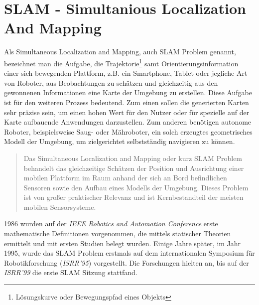 \section{SLAM - Simultanious Localization And Mapping}
\label{chap:SLAM}
Als Simultaneous Localization and Mapping, auch \acs{SLAM} Problem genannt, bezeichnet man die Aufgabe, die Trajektorie\footnote{Lösungskurve oder Bewegungspfad eines Objekts} 
samt Orientierungsinformation einer sich bewegenden Plattform, z.B. ein Smartphone, Tablet oder jegliche Art von Roboter, aus 
Beobachtungen zu schätzen und gleichzeitig aus den gewonnenen Informationen eine Karte der Umgebung zu erstellen.
Diese Aufgabe ist für den weiteren Prozess bedeutend. Zum einen sollen die generierten Karten sehr präzise sein, um einen hohen 
Wert für den Nutzer oder für spezielle auf der Karte aufbauende Anwendungen darzustellen. Zum anderen benötigen autonome Roboter, 
beispielsweise Saug- oder Mähroboter, ein solch erzeugtes geometrisches Modell der Umgebung, um zielgerichtet selbstständig navigieren zu 
können. %
\begin{quote}
    Das Simultaneous Localization and Mapping oder kurz SLAM Problem behandelt das gleichzeitige Schätzen der Position und Ausrichtung einer 
    mobilen Plattform im Raum anhand der sich an Bord befindlichen Sensoren sowie den Aufbau eines Modells der Umgebung. Dieses Problem ist 
    von großer praktischer Relevanz und ist Kernbestandteil der meisten mobilen Sensorsysteme. \cite{slamdefi.2016a}
\end{quote}
1986 wurden auf der \textit{IEEE Robotics and Automation Conference} erste mathematische Definitionen vorgenommen, die mittels statischer 
Theorien ermittelt und mit ersten Studien belegt wurden. Einige Jahre später, im Jahr 1995, wurde das \acs{SLAM} Problem erstmals auf dem 
internationalen Symposium für Robotikforschung (\textit{ISRR'95}) vorgestellt. Die Forschungen hielten an, bis auf der \textit{ISRR'99} 
die erste \acs{SLAM} Sitzung stattfand. 

